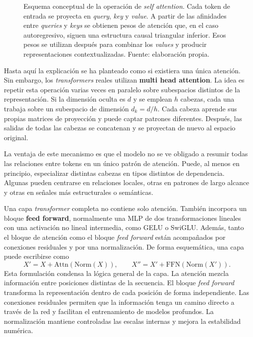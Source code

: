 \begin{figure}[H]
\caption{Esquema conceptual de la operación de \textit{self attention}. Cada token de entrada se proyecta en \textit{query}, \textit{key} y \textit{value}. A partir de las afinidades entre \textit{queries} y \textit{keys} se obtienen pesos de atención que, en el caso autoregresivo, siguen una estructura causal triangular inferior. Esos pesos se utilizan después para combinar los \textit{values} y producir representaciones contextualizadas. Fuente: elaboración propia.}
\label{fig:self_attention_transformer}
\end{figure}

Hasta aquí la explicación se ha planteado como si existiera una única atención. Sin embargo, los \textit{transformers} reales utilizan \textbf{multi head attention}. La idea es repetir esta operación varias veces en paralelo sobre subespacios distintos de la representación. Si la dimensión oculta es $d$ y se emplean $h$ cabezas, cada una trabaja sobre un subespacio de dimensión $d_k=d/h$. Cada cabeza aprende sus propias matrices de proyección y puede captar patrones diferentes. Después, las salidas de todas las cabezas se concatenan y se proyectan de nuevo al espacio original.

La ventaja de este mecanismo es que el modelo no se ve obligado a resumir todas las relaciones entre tokens en un único patrón de atención. Puede, al menos en principio, especializar distintas cabezas en tipos distintos de dependencia. Algunas pueden centrarse en relaciones locales, otras en patrones de largo alcance y otras en señales más estructurales o semánticas.

Una capa \textit{transformer} completa no contiene solo atención. También incorpora un bloque \textbf{feed forward}, normalmente una MLP de dos transformaciones lineales con una activación no lineal intermedia, como GELU o SwiGLU. Además, tanto el bloque de atención como el bloque \textit{feed forward} están acompañados por conexiones residuales y por una normalización. De forma esquemática, una capa puede escribirse como
\[
X' = X + \mathrm{Attn}(\mathrm{Norm}(X)),\qquad
X'' = X' + \mathrm{FFN}(\mathrm{Norm}(X')).
\]
Esta formulación condensa la lógica general de la capa. La atención mezcla información entre posiciones distintas de la secuencia. El bloque \textit{feed forward} transforma la representación dentro de cada posición de forma independiente. Las conexiones residuales permiten que la información tenga un camino directo a través de la red y facilitan el entrenamiento de modelos profundos. La normalización mantiene controladas las escalas internas y mejora la estabilidad numérica.

